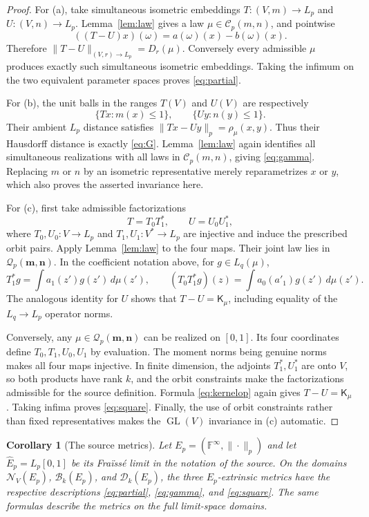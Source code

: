 \documentclass[11pt]{article}
\newtheorem{corollary}[theorem]{Corollary}
\newcommand{\F}{\mathbb F}
\newcommand{\GL}{\operatorname{GL}}
\begin{document}
\begin{proof}
For (a), take simultaneous isometric embeddings
$T:(V,m)\to L_p$ and $U:(V,n)\to L_p$.  Lemma~\ref{lem:law} gives a law
$\mu\in\mathcal C_p(m,n)$, and pointwise
\[
       ((T-U)x)(\omega)=a(\omega)(x)-b(\omega)(x).
\]
Therefore $\|T-U\|_{(V,r)\to L_p}=D_r(\mu)$.  Conversely every admissible
$\mu$ produces exactly such simultaneous isometric embeddings.  Taking
the infimum on the two equivalent parameter spaces proves
\eqref{eq:partial}.

For (b), the unit balls in the ranges $T(V)$ and $U(V)$ are respectively
\[
       \{Tx:m(x)\leq1\},\qquad \{Uy:n(y)\leq1\}.
\]
Their ambient $L_p$ distance satisfies $\|Tx-Uy\|_p=\rho_\mu(x,y)$.
Thus their Hausdorff distance is exactly \eqref{eq:G}.  Lemma~\ref{lem:law}
again identifies all simultaneous realizations with all laws in
$\mathcal C_p(m,n)$, giving \eqref{eq:gamma}.  Replacing $m$ or $n$ by an
isometric representative merely reparametrizes $x$ or $y$, which also
proves the asserted invariance here.

For (c), first take admissible factorizations
\[
 T=T_0T_1^*,\qquad U=U_0U_1^*,
\]
where $T_0,U_0:V\to L_p$ and $T_1,U_1:V^*\to L_p$ are injective and induce
the prescribed orbit pairs.  Apply Lemma~\ref{lem:law} to the four maps.
Their joint law lies in $\mathcal Q_p(\mathbf m,\mathbf n)$.  In the
coefficient notation above, for $g\in L_q(\mu)$,
\[
 T_1^*g=\int a_1(z')g(z')\,d\mu(z'),
 \qquad
 (T_0T_1^*g)(z)=
 \int a_0(a'_1)g(z')\,d\mu(z').
\]
The analogous identity for $U$ shows that $T-U=\mathsf K_\mu$, including
equality of the $L_q\to L_p$ operator norms.

Conversely, any $\mu\in\mathcal Q_p(\mathbf m,\mathbf n)$ can be realized
on $[0,1]$.  Its four coordinates define $T_0,T_1,U_0,U_1$ by evaluation.
The moment norms being genuine norms makes all four maps injective.  In
finite dimension, the adjoints $T_1^*,U_1^*$ are onto $V$, so both products
have rank $k$, and the orbit constraints make the factorizations admissible
for the source definition.  Formula \eqref{eq:kernelop} again gives
$T-U=\mathsf K_\mu$.  Taking infima proves \eqref{eq:square}.  Finally,
the use of orbit constraints rather than fixed representatives makes the
$\GL(V)$ invariance in (c) automatic.
\end{proof}

\begin{corollary}[The source metrics]\label{cor:source}
Let $E_p=(\F^\infty,\|\cdot\|_p)$ and let $\widehat E_p=L_p[0,1]$ be its
Fra\"iss\'{e} limit in the notation of the source.  On the domains
$\mathcal N_V(E_p)$, $\mathcal B_k(E_p)$, and $\mathcal D_k(E_p)$, the
three $E_p$-extrinsic metrics have the respective descriptions
\eqref{eq:partial}, \eqref{eq:gamma}, and \eqref{eq:square}.
The same formulas describe the metrics on the full limit-space domains.
\end{corollary}
\end{document}
